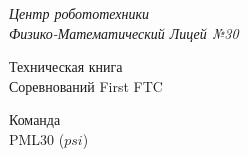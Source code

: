 \thispagestyle{titlestyle}

\begin{titlepage}
	\newpage
	
	\begin{center}
		\LARGE\textit{Центр робототехники \\ Физико-Математический Лицей №30}
		
		\vspace{8em}
		
		\LARGE{Техническая книга \\ Соревнований First FTC}
		
		\vspace{4em}
		
		Команда \\ PML30 ($psi$)
		
	\end{center}
\end{titlepage}

\newpage